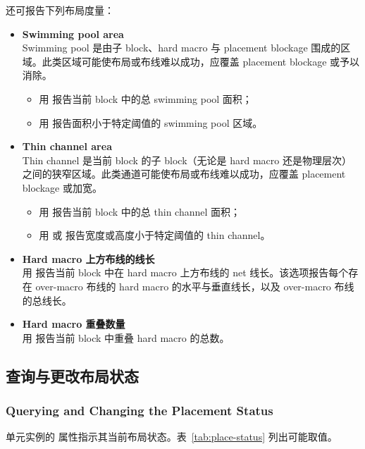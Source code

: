 还可报告下列布局度量：
\begin{itemize}
  \item \textbf{Swimming pool area}\\
        Swimming pool 是由子 block、hard macro 与 placement blockage 围成的区域。此类区域可能使布局或布线难以成功，应覆盖 placement blockage 或予以消除。
        \begin{itemize}
          \item 用  报告当前 block 中的总 swimming pool 面积；
          \item 用  报告面积小于特定阈值的 swimming pool 区域。
        \end{itemize}
  \item \textbf{Thin channel area}\\
        Thin channel 是当前 block 的子 block（无论是 hard macro 还是物理层次）之间的狭窄区域。此类通道可能使布局或布线难以成功，应覆盖 placement blockage 或加宽。
        \begin{itemize}
          \item 用  报告当前 block 中的总 thin channel 面积；
          \item 用  或  报告宽度或高度小于特定阈值的 thin channel。
        \end{itemize}
  \item \textbf{Hard macro 上方布线的线长}\\
        用  报告当前 block 中在 hard macro 上方布线的 net 线长。该选项报告每个存在 over-macro 布线的 hard macro 的水平与垂直线长，以及 over-macro 布线的总线长。
  \item \textbf{Hard macro 重叠数量}\\
        用  报告当前 block 中重叠 hard macro 的总数。
\end{itemize}

\subsection{查询与更改布局状态}
\subsubsection*{Querying and Changing the Placement Status}

单元实例的  属性指示其当前布局状态。表~\ref{tab:place-status} 列出可能取值。

